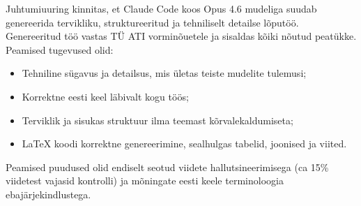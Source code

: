 Juhtumiuuring kinnitas, et Claude Code koos Opus 4.6 mudeliga suudab genereerida tervikliku, struktureeritud ja tehniliselt detailse lõputöö. Genereeritud töö vastas TÜ ATI vorminõuetele ja sisaldas kõiki nõutud peatükke. Peamised tugevused olid:
\begin{itemize}
    \item Tehniline sügavus ja detailsus, mis ületas teiste mudelite tulemusi;
    \item Korrektne eesti keel läbivalt kogu töös;
    \item Terviklik ja sisukas struktuur ilma teemast kõrvalekaldumiseta;
    \item \LaTeX{} koodi korrektne genereerimine, sealhulgas tabelid, joonised ja viited.
\end{itemize}

Peamised puudused olid endiselt seotud viidete hallutsineerimisega (ca 15\% viidetest vajasid kontrolli) ja mõningate eesti keele terminoloogia ebajärjekindlustega.
